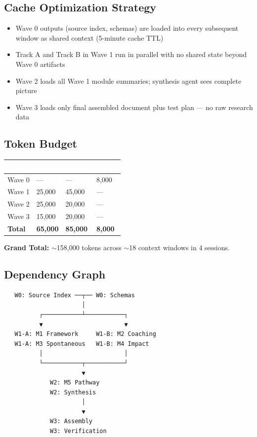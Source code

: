 \documentclass[11pt,letterpaper]{article}
\newcommand{\tableheader}[1]{\textbf{\sffamily\textcolor{white}{#1}}}
\begin{document}
\subsection{Cache Optimization Strategy}

\begin{itemize}[leftmargin=2em]
\item Wave 0 outputs (source index, schemas) are loaded into every subsequent window as shared context (5-minute cache TTL)
\item Track A and Track B in Wave 1 run in parallel with no shared state beyond Wave 0 artifacts
\item Wave 2 loads all Wave 1 module summaries; synthesis agent sees complete picture
\item Wave 3 loads only final assembled document plus test plan --- no raw research data
\end{itemize}

\subsection{Token Budget}

\begin{center}
\begin{tabularx}{\textwidth}{L{4cm}C{2cm}C{2cm}C{2cm}}
\toprule
{}
\tableheader{Wave} & \tableheader{Opus} & \tableheader{Sonnet} & \tableheader{Haiku} \\
\midrule
Wave 0 & --- & --- & 8,000 \\
Wave 1 & 25,000 & 45,000 & --- \\
Wave 2 & 25,000 & 20,000 & --- \\
Wave 3 & 15,000 & 20,000 & --- \\
\midrule
\textbf{Total} & \textbf{65,000} & \textbf{85,000} & \textbf{8,000} \\
\bottomrule
\end{tabularx}
\end{center}

\textbf{Grand Total:} $\sim$158,000 tokens across $\sim$18 context windows in 4 sessions.

\subsection{Dependency Graph}

\begin{asciibox}
\begin{verbatim}
   W0: Source Index ──┬── W0: Schemas
                      │
          ┌───────────┴───────────┐
          ▼                       ▼
   W1-A: M1 Framework     W1-B: M2 Coaching
   W1-A: M3 Spontaneous   W1-B: M4 Impact
          │                       │
          └───────────┬───────────┘
                      ▼
             W2: M5 Pathway
             W2: Synthesis
                      │
                      ▼
             W3: Assembly
             W3: Verification
\end{verbatim}
\end{asciibox}
\end{document}
